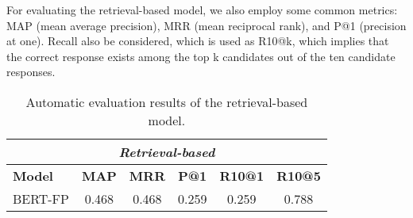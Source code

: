 \documentclass[11pt]{article}
\begin{document}
For evaluating the retrieval-based model, we also employ some common metrics:  MAP (mean average
precision), MRR (mean reciprocal rank), and P@1
(precision at one). Recall also be considered, which is used as
R10@k, which implies that the correct response exists among the top k candidates out of the ten candidate responses.



\begin{table}[t]
    \begin{center}
    \centering
    \small
\setlength{\tabcolsep}{1mm}
    \begin{tabular}{lccccc}
\toprule


\multicolumn{6}{c}{\it{Retrieval-based}}\\
     \midrule
     \midrule
 \textbf{Model} & \textbf{MAP}& \textbf{MRR}& \textbf{P@1}& \textbf{R10@1} & \textbf{R10@5} \\
 \midrule
 BERT-FP & 0.468&0.468  & 0.259&0.259&0.788 \\
    \bottomrule
    \end{tabular}
    \end{center}
    \caption{
        Automatic evaluation results of the retrieval-based model.
    }
    \label{tab:auto_evaluation}
\end{table}




%
 

\end{document}
